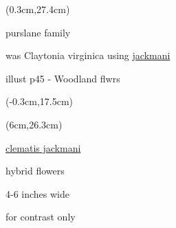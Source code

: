 \documentclass[a4paper,9pt]{article}
\begin{document}
\begin{textblock*}{8cm}(0.3cm,27.4cm)%
	\tiny
	\begin{minipage}{8cm} 
		\tiny
		\hspace{1.5cm}\color{blue}purslane family\par
		\color{red}
		was Claytonia virginica using \ul{jackmani}\par
		illust p45 - Woodland flwrs\par		
	\end{minipage}%
\end{textblock*}%


\begin{textblock*}{4in}(-0.3cm,17.5cm)%
	\tiny
\end{textblock*}%

\begin{textblock*}{4in}(6cm,26.3cm)%
	\scriptsize
	\begin{minipage}{4in} 
		\ul{clematis jackmani}\par
		hybrid flowers\par
		4-6 inches wide\par
		for contrast only\par
	\end{minipage}%
\end{textblock*}%
\end{document}
